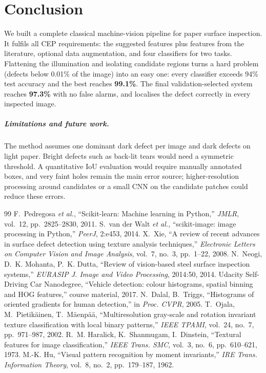 \documentclass[11pt,a4paper]{report}
\begin{document}
\chapter{Conclusion}
We built a complete classical machine-vision pipeline for paper surface inspection. It
fulfils all CEP requirements: the suggested features plus features from the literature,
optional data augmentation, and four classifiers for two tasks. Flattening the illumination
and isolating candidate regions turns a hard problem (defects below 0.01\% of the image)
into an easy one: every classifier exceeds 94\% test accuracy and the best reaches
\textbf{99.1\%}. The final validation-selected system reaches \textbf{97.3\%} with no false
alarms, and localises the defect correctly in every inspected image.

\paragraph{Limitations and future work.} The method assumes one dominant dark defect per image
and dark defects on light paper. Bright defects such as back-lit tears would need a
symmetric threshold. A quantitative IoU evaluation would require manually annotated boxes,
and very faint holes remain the main error source; higher-resolution processing around
candidates or a small CNN on the candidate patches could reduce these errors.

\begin{thebibliography}{99}
 F.~Pedregosa \emph{et al.}, ``Scikit-learn: Machine learning in Python,'' \emph{JMLR}, vol.~12, pp.~2825--2830, 2011.
 S.~van der Walt \emph{et al.}, ``scikit-image: image processing in Python,'' \emph{PeerJ}, 2:e453, 2014.
 X.~Xie, ``A review of recent advances in surface defect detection using texture analysis techniques,'' \emph{Electronic Letters on Computer Vision and Image Analysis}, vol.~7, no.~3, pp.~1--22, 2008.
 N.~Neogi, D.~K. Mohanta, P.~K. Dutta, ``Review of vision-based steel surface inspection systems,'' \emph{EURASIP J. Image and Video Processing}, 2014:50, 2014.
 Udacity Self-Driving Car Nanodegree, ``Vehicle detection: colour histograms, spatial binning and HOG features,'' course material, 2017.
 N.~Dalal, B.~Triggs, ``Histograms of oriented gradients for human detection,'' in \emph{Proc. CVPR}, 2005.
 T.~Ojala, M.~Pietik\"ainen, T.~M\"aenp\"a\"a, ``Multiresolution gray-scale and rotation invariant texture classification with local binary patterns,'' \emph{IEEE TPAMI}, vol.~24, no.~7, pp.~971--987, 2002.
 R.~M. Haralick, K.~Shanmugam, I.~Dinstein, ``Textural features for image classification,'' \emph{IEEE Trans. SMC}, vol.~3, no.~6, pp.~610--621, 1973.
 M.-K. Hu, ``Visual pattern recognition by moment invariants,'' \emph{IRE Trans. Information Theory}, vol.~8, no.~2, pp.~179--187, 1962.
\end{thebibliography}
\end{document}
